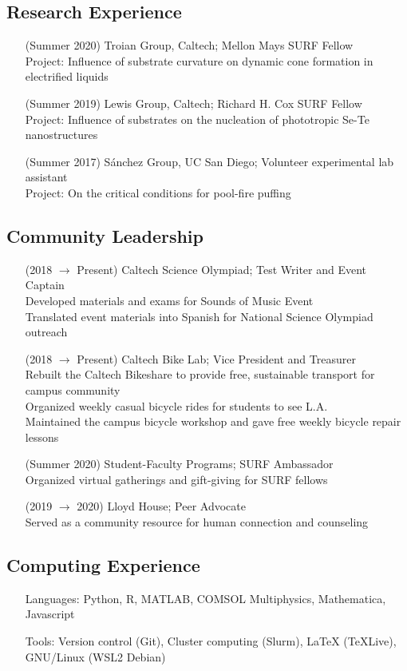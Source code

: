 \documentclass{article}
\begin{document}
\nocite{*}
\printbibliography[title={Publications}, heading=subbibliography]


\subsection*{Research Experience}

\begin{enumerate}
    \item [(Summer 2020)] Troian Group, Caltech; Mellon Mays SURF Fellow \\
        Project: Influence of substrate curvature on dynamic cone formation in electrified liquids
    \item [(Summer 2019)] Lewis Group, Caltech; Richard H. Cox SURF Fellow \\
        Project: Influence of substrates on the nucleation of phototropic Se-Te nanostructures
    \item [(Summer 2017)] Sánchez Group, UC San Diego; Volunteer experimental lab assistant \\
        Project: On the critical conditions for pool-fire puffing
\end{enumerate}


\subsection*{Community Leadership}

\begin{enumerate}
    \item [(2018 $\to$ Present)] Caltech Science Olympiad; Test Writer and Event Captain \\
        Developed materials and exams for Sounds of Music Event \\
        Translated event materials into Spanish for National Science Olympiad outreach
    \item [(2018 $\to$ Present)] Caltech Bike Lab; Vice President and Treasurer \\
        Rebuilt the Caltech Bikeshare to provide free, sustainable transport for campus community \\
        Organized weekly casual bicycle rides for students to see L.A. \\
        Maintained the campus bicycle workshop and gave free weekly bicycle repair lessons
    \item [(Summer 2020)] Student-Faculty Programs; SURF Ambassador \\
        Organized virtual gatherings and gift-giving for SURF fellows
    \item [(2019 $\to$ 2020)] Lloyd House; Peer Advocate \\
        Served as a community resource for human connection and counseling
\end{enumerate}


\subsection*{Computing Experience}

\begin{enumerate}
	\item [Languages:] Python, R, MATLAB, COMSOL Multiphysics, Mathematica, Javascript
	\item [Tools:] Version control (Git), Cluster computing (Slurm), LaTeX (TeXLive), GNU/Linux (WSL2 Debian)
\end{enumerate}
\end{document}
